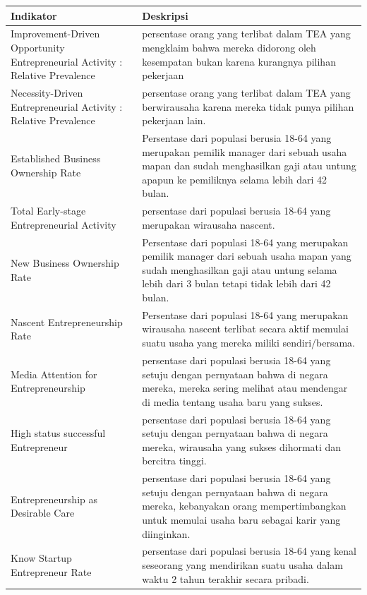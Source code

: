 \documentclass[a4paper,twoside]{article}
\begin{document}
\begin{enumerate}
\begin{table}[H]
\centering
\begin{tabular}{|p{3cm}|p{10cm}|}
\hline
Indikator & Deskripsi\\
\hline
Improvement-Driven Opportunity Entrepreneurial Activity : Relative Prevalence & persentase orang yang terlibat dalam TEA yang mengklaim bahwa mereka didorong oleh kesempatan bukan karena kurangnya pilihan pekerjaan\\
\hline
Necessity-Driven Entrepreneurial Activity : Relative Prevalence & persentase orang yang terlibat dalam TEA yang berwirausaha karena mereka tidak punya pilihan pekerjaan lain.\\
\hline
Established Business Ownership Rate & Persentase dari populasi berusia 18-64 yang merupakan pemilik manager dari sebuah usaha mapan dan sudah menghasilkan gaji atau untung apapun ke pemiliknya selama lebih dari 42 bulan.\\
\hline
Total Early-stage Entrepreneurial Activity & persentase dari populasi berusia 18-64 yang merupakan wirausaha nascent.\\
\hline
New Business Ownership Rate & Persentase dari populasi 18-64 yang merupakan pemilik manager dari sebuah usaha mapan yang sudah menghasilkan gaji atau untung selama lebih dari 3 bulan tetapi tidak lebih dari 42 bulan.\\
\hline
Nascent Entrepreneurship Rate & Persentase dari populasi 18-64 yang merupakan wirausaha nascent terlibat secara aktif memulai suatu usaha yang mereka miliki sendiri/bersama.\\
\hline
Media Attention for Entrepreneurship & persentase dari populasi berusia 18-64 yang setuju dengan pernyataan bahwa di negara mereka, mereka sering melihat atau mendengar di media tentang usaha baru yang sukses.\\
\hline
High status successful Entrepreneur & persentase dari populasi berusia 18-64 yang setuju dengan pernyataan bahwa di negara mereka, wirausaha yang sukses dihormati dan bercitra tinggi.\\
\hline
Entrepreneurship as Desirable Care & persentase dari populasi berusia 18-64 yang setuju dengan pernyataan bahwa di negara mereka, kebanyakan orang mempertimbangkan untuk memulai usaha baru sebagai karir yang diinginkan.\\
\hline
Know Startup Entrepreneur Rate & persentase dari populasi berusia 18-64 yang kenal seseorang yang mendirikan suatu usaha dalam waktu 2 tahun terakhir secara pribadi.\\
\hline
\end{tabular}
\end{table}



\end{enumerate}
\end{document}
